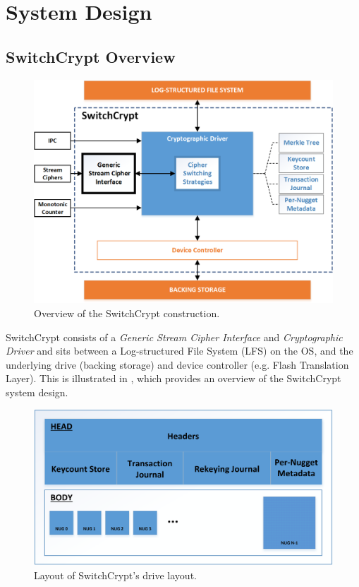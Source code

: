 \section{System Design} \label{sec:sc-design}

\subsection{SwitchCrypt Overview} \label{subsec:overview}

\begin{figure}[ht]
   \centering
   \includegraphics[width=\linewidth]{figs/sc/overview.png}
   \caption{Overview of the SwitchCrypt construction.} \label{fig:overview}
\end{figure}

SwitchCrypt consists of a \emph{Generic Stream Cipher Interface} and
\emph{Cryptographic Driver} and sits between a Log-structured File System (LFS)
on the OS, and the underlying drive (backing storage) and device controller
(e.g. Flash Translation Layer). This is illustrated in , which
provides an overview of the SwitchCrypt system design.

\begin{figure}[t]
   \centering
   \includegraphics[width=\linewidth]{figs/sc/backstore.png}
   \caption{Layout of SwitchCrypt's drive layout.} \label{fig:backstore}
\end{figure}

